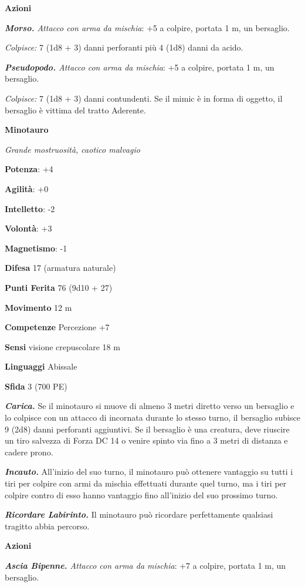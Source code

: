 \begin{multicols}{2}
\smallskip\textbf{Azioni}

\emph{\textbf{Morso.} Attacco con arma da mischia}: +5 a colpire,
portata 1 m, un bersaglio.

\emph{Colpisce:} 7 (1d8 + 3) danni perforanti più 4 (1d8) danni da
acido.

\emph{\textbf{Pseudopodo.} Attacco con arma da mischia}: +5 a colpire,
portata 1 m, un bersaglio.

\emph{Colpisce:} 7 (1d8 + 3) danni contundenti. Se il mimic è in forma
di oggetto, il bersaglio è vittima del tratto Aderente.



\textbf{Minotauro}

\emph{Grande mostruosità, caotico malvagio}

\textbf{Potenza}: +4

\textbf{Agilità}: +0

\textbf{Intelletto}: -2

\textbf{Volontà}: +3

\textbf{Magnetismo}: -1

\textbf{Difesa} 17 (armatura naturale)

\textbf{Punti Ferita} 76 (9d10 + 27)

\textbf{Movimento} 12 m

\textbf{Competenze} Percezione +7

\textbf{Sensi} visione crepuscolare 18 m

\textbf{Linguaggi} Abissale

\textbf{Sfida} 3 (700 PE)\smallskip

\emph{\textbf{Carica.}} Se il minotauro si muove di almeno 3 metri
diretto verso un bersaglio e lo colpisce con un attacco di incornata
durante lo stesso turno, il bersaglio subisce 9 (2d8) danni perforanti
aggiuntivi. Se il bersaglio è una creatura, deve riuscire un tiro
salvezza di Forza DC 14 o venire spinto via fino a 3 metri di distanza e
cadere prono.

\emph{\textbf{Incauto.}} All'inizio del suo turno, il minotauro può
ottenere vantaggio su tutti i tiri per colpire con armi da mischia
effettuati durante quel turno, ma i tiri per colpire contro di esso
hanno vantaggio fino all'inizio del suo prossimo turno.

\emph{\textbf{Ricordare Labirinto.}} Il minotauro può ricordare
perfettamente qualsiasi tragitto abbia percorso.

\smallskip\textbf{Azioni}

\emph{\textbf{Ascia Bipenne.} Attacco con arma da mischia}: +7 a
colpire, portata 1 m, un bersaglio.


\end{multicols}
